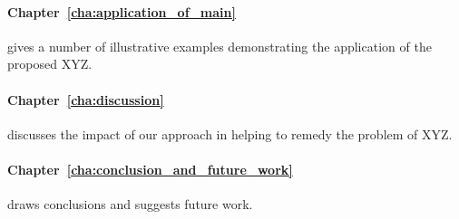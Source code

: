 \paragraph{Chapter~\ref{cha:application_of_main}} gives a number of illustrative examples demonstrating the application of the proposed XYZ.

\paragraph{Chapter~\ref{cha:discussion}} discusses the impact of our approach in helping to remedy the problem of XYZ.

\paragraph{Chapter~\ref{cha:conclusion_and_future_work}} draws conclusions and suggests future work.

